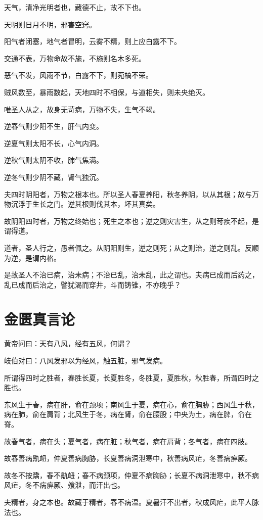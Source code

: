 \documentclass{article}%
\begin{document}
天气，清净光明者也，藏德不止，故不下也。

天明则日月不明，邪害空窍。

阳气者闭塞，地气者冒明，云雾不精，则上应白露不下。

交通不表，万物命故不施，不施则名木多死。

恶气不发，风雨不节，白露不下，则菀槁不荣。

贼风数至，暴雨数起，天地四时不相保，与道相失，则未央绝灭。

唯圣人从之，故身无苛病，万物不失，生气不竭。

逆春气则少阳不生，肝气内变。

逆夏气则太阳不长，心气内洞。

逆秋气则太阴不收，肺气焦满。

逆冬气则少阴不藏，肾气独沉。

夫四时阴阳者，万物之根本也。所以圣人春夏养阳，秋冬养阴，以从其根；故与万物沉浮于生长之门。逆其根则伐其本，坏其真矣。

故阴阳四时者，万物之终始也；死生之本也；逆之则灾害生，从之则苛疾不起，是谓得道。

道者，圣人行之，愚者佩之。从阴阳则生，逆之则死；从之则治，逆之则乱。反顺为逆，是谓内格。

是故圣人不治已病，治未病；不治已乱，治未乱，此之谓也。夫病已成而后药之，乱已成而后治之，譬犹渴而穿井，斗而铸锥，不亦晚乎？


\section{金匮真言论}
黄帝问曰：天有八风，经有五风，何谓？

岐伯对曰：八风发邪以为经风，触五脏，邪气发病。

所谓得四时之胜者，春胜长夏，长夏胜冬，冬胜夏，夏胜秋，秋胜春，所谓四时之胜也。

东风生于春，病在肝，俞在颈项；南风生于夏，病在心，俞在胸胁；西风生于秋，病在肺，俞在肩背；北风生于冬，病在肾，俞在腰股；中央为土，病在脾，俞在脊。

故春气者，病在头；夏气者，病在脏；秋气者，病在肩背；冬气者，病在四肢。

故春善病鼽衄，仲夏善病胸胁，长夏善病洞泄寒中，秋善病风疟，冬善病痹厥。

故冬不按蹻，春不鼽衄；春不病颈项，仲夏不病胸胁；长夏不病洞泄寒中，秋不病风疟，冬不病痹厥、飧泄，而汗出也。

夫精者，身之本也。故藏于精者，春不病温。夏暑汗不出者，秋成风疟，此平人脉法也。
\end{document}
